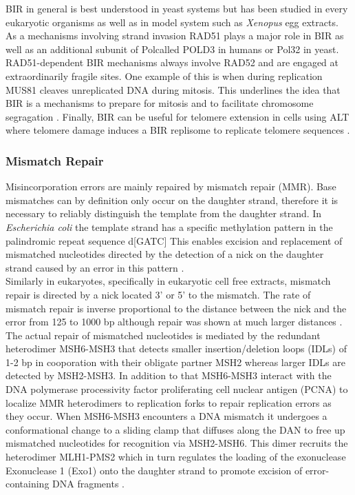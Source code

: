 BIR in general is best understood in yeast systems but has been studied in every eukaryotic organisms as well as in model system such as \textit{Xenopus} egg extracts. As a mechanisms involving strand invasion RAD51 plays a major role in BIR as well as an additional subunit of Pol\textdelta called POLD3 in humans or Pol32 in yeast. RAD51-dependent BIR mechanisms always involve RAD52 and are engaged at extraordinarily fragile sites. One example of this is when during replication MUS81 cleaves unreplicated DNA during mitosis. This underlines the idea that BIR is a mechanisms to prepare for mitosis and to facilitate chromosome segragation \citep{Bhowmick.2016}. Finally, BIR can be useful for telomere extension in cells using ALT where telomere damage induces a BIR replisome to replicate telomere sequences \citep{Dilley.2016}.

\subsubsection{Mismatch Repair}
Misincorporation errors are mainly repaired by mismatch repair (MMR). Base mismatches can by definition only occur on the daughter strand, therefore it is necessary to reliably distinguish the template from the daughter strand. In \textit{Escherichia coli} the template strand has a specific methylation pattern in the palindromic repeat sequence d[GATC] This enables excision and replacement of mismatched nucleotides  directed by the detection of a nick on the daughter strand caused by an error in this pattern \citep{Kunkel.2005}.\\
Similarly in eukaryotes, specifically in eukaryotic cell free extracts, mismatch repair is directed by a nick located 3' or 5' to the mismatch. The rate of mismatch repair is inverse proportional to the distance between the nick and the error from 125 to 1000 bp although repair was shown at much larger distances \citep{Iyer.2006}.\\
The actual repair of mismatched nucleotides is mediated by the redundant heterodimer MSH6-MSH3 that detects smaller insertion/deletion loops (IDLs) of 1-2 bp in cooporation with their obligate partner MSH2 whereas larger IDLs are detected by MSH2-MSH3. In addition to that MSH6-MSH3 interact with the DNA polymerase processivity factor proliferating cell nuclear antigen (PCNA) to localize MMR heterodimers to replication forks to repair replication errors as they occur. When MSH6-MSH3 encounters a DNA mismatch it undergoes a conformational change to a sliding clamp that diffuses along the DAN to free up mismatched nucleotides for recognition via MSH2-MSH6. This dimer recruits the heterodimer MLH1-PMS2 which in turn regulates the loading of the exonuclease Exonuclease 1 (Exo1) onto the daughter strand to promote excision of error-containing DNA fragments \citep{Gupta.2019}.
\newpage

